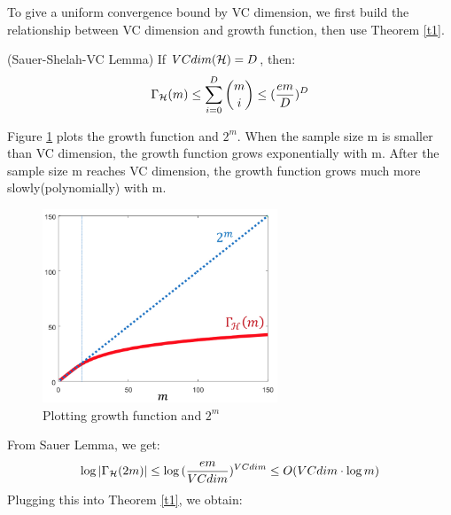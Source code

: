 \documentclass{article}
\begin{document}
To give a uniform convergence bound by VC dimension, we first build the relationship between VC dimension and growth function, then use Theorem \ref{t1}.
\begin{lemma}(Sauer-Shelah-VC Lemma)
	If $VCdim(\mathcal{H})=D$, then:
	\begin{displaymath}
  		\Gamma_{\mathcal{H}}(m) \leq \sum_{i=0}^D\binom m i \leq (\frac{em}{D})^D
	\end{displaymath}
\end{lemma}
Figure \ref{f3} plots the growth function and $2^m$. When the sample size m is smaller than VC dimension, the growth function grows exponentially with m. After the sample size m reaches VC dimension, the growth function grows much more slowly(polynomially) with m.
\begin{figure}[H]
  \centering
  \includegraphics[width=70mm]{f3}
  \caption{Plotting growth function and $2^m$}\label{f3}
\end{figure}
From Sauer Lemma, we get:
\begin{displaymath}
  \log{|\Gamma_{\mathcal{H}}(2m)|} \leq \log{(\frac{em}{VCdim})^{VCdim}} \leq O(VCdim\cdot \log{m})
\end{displaymath}
Plugging this into Theorem \ref{t1}, we obtain:
\end{document}

